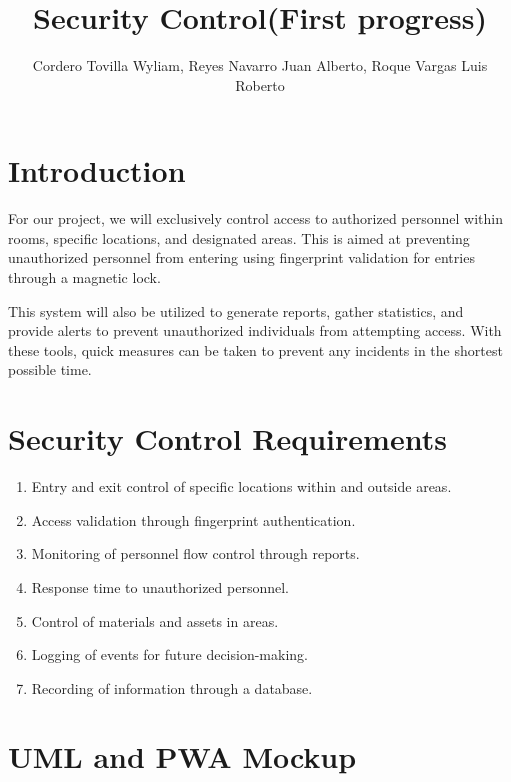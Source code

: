 \documentclass{IEEEtran}
\begin{document}
	
	\title{Security Control(First progress)}
	\author{Cordero Tovilla Wyliam, Reyes Navarro Juan Alberto, Roque Vargas Luis Roberto}
	\maketitle
	
	\section*{Introduction}

	For our project, we will exclusively control access to authorized personnel within rooms, specific locations, and designated areas. This is aimed at preventing unauthorized personnel from entering using fingerprint validation for entries through a magnetic lock.

	This system will also be utilized to generate reports, gather statistics, and provide alerts to prevent unauthorized individuals from attempting access. With these tools, quick measures can be taken to prevent any incidents in the shortest possible time.
	
	\section*{Security Control Requirements}
	
	\begin{enumerate}
		\item Entry and exit control of specific locations within and outside areas.
		\item Access validation through fingerprint authentication.
		\item Monitoring of personnel flow control through reports.
		\item Response time to unauthorized personnel.
		\item Control of materials and assets in areas.
		\item Logging of events for future decision-making.
		\item Recording of information through a database.
	\end{enumerate}
	
	\section*{UML and PWA Mockup}
	
\end{document}
